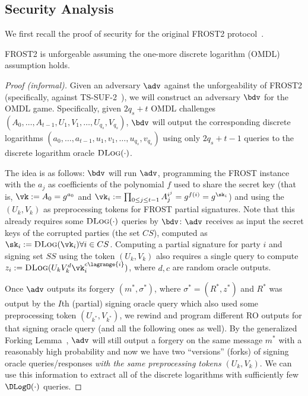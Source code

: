 \subsection{Security Analysis}

We first recall the proof of security for the original FROST2 protocol~\cite{C:BCKMTZ22}.

\begin{theorem}[informal]
    FROST2 is unforgeable assuming the one-more discrete logarithm (OMDL) assumption holds.
\end{theorem}

\begin{proof}[Proof (informal)]
Given an adversary $\adv$ against the unforgeability of FROST2 (specifically, against TS-SUF-2~\cite{C:BCKMTZ22}), we will construct an adversary $\bdv$ for the OMDL game. Specifically, given $2q_s + t$ OMDL challenges $(A_0, \dots, A_{t-1},\allowbreak U_1, V_1, \dots, U_{q_s}, V_{q_s})$, $\bdv$ will output the corresponding discrete logarithms $(a_0,\allowbreak \dots, a_{t-1}, u_1, v_1,\allowbreak \dots, u_{q_s}, v_{q_s})$ using only $2q_s + t - 1$ queries to the discrete logarithm oracle $\textsc{DLog}(\cdot)$.

The idea is as follows: $\bdv$ will run $\adv$, programming the FROST instance with the $a_j$ as coefficients of the polynomial $f$ used to share the secret key (that is, $\vk := A_0 = g^{a_0}$ and $\vk_i := \prod_{0 \leq j \leq t-1} A_j^{i^j} = g^{f(i)} = g^{\sk_i}$) and using the $(U_k, V_k)$ as preprocessing tokens for FROST partial signatures. Note that this already requires some $\textsc{DLog}(\cdot)$ queries by $\bdv$: $\adv$ receives as input the secret keys of the corrupted parties (the set $CS$), computed as $\sk_i := \textsc{DLog}(\vk_i) \forall i \in CS$. Computing a partial signature for party $i$ and signing set $SS$ using the token $(U_k, V_k)$ also requires a single query to compute $z_i := \textsc{DLog}(U_k V_k^d \vk_i^{c \lagrange{i}})$, where $d, c$ are random oracle outputs.

Once $\adv$ outputs its forgery $(m^*, \sigma^*)$, where $\sigma^* = (R^*, z^*)$ and $R^*$ was output by the $I$th (partial) signing oracle query which also used some preprocessing token $(U_{k^*}, V_{k^*})$, we rewind and program different RO outputs for that signing oracle query (and all the following ones as well). By the generalized Forking Lemma~\cite{CCS:BelNev06}, $\adv$ will still output a forgery on the same message $m^*$ with a reasonably high probability and now we have two ``versions'' (forks) of signing oracle queries/responses \emph{with the same preprocessing tokens $(U_k, V_k)$}. We can use this information to extract all of the discrete logarithms with sufficiently few $\DLogO(\cdot)$ queries.


\end{proof}
